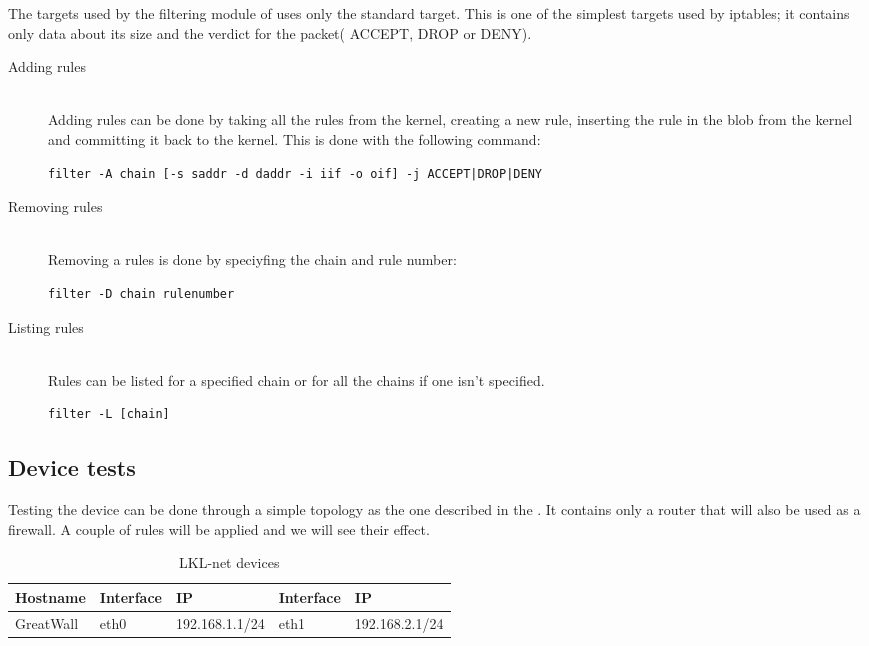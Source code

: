 The targets used by the filtering module of \text{\project} uses only the standard target. This is one of the simplest targets
used by iptables; it contains only data about its size and the verdict for the packet( ACCEPT, DROP or DENY).

\begin{description}
\item[Adding rules] \hfill \\
Adding rules can be done by taking all the rules from the kernel, creating a 
new rule, inserting the rule in the blob from the kernel and committing it back
to the kernel. This is done with the following command:
\lstset{language=zsh,caption=Adding a rule,label=lst:saddrule}
\begin{lstlisting}
filter -A chain [-s saddr -d daddr -i iif -o oif] -j ACCEPT|DROP|DENY
\end{lstlisting}
\item[Removing rules] \hfill \\
Removing a rules is done by speciyfing the chain and rule number:
\lstset{language=zsh,caption=Deleting a rule,label=lst:sdelrule}
\begin{lstlisting}
filter -D chain rulenumber
\end{lstlisting}
\item[Listing rules] \hfill \\
Rules can be listed for a specified chain or for all the chains if one isn't specified.
\lstset{language=zsh,caption=List rules,label=lst:slstrule}
\begin{lstlisting}
filter -L [chain]
\end{lstlisting}
\end{description}

\subsection{Device tests}
\label{sub-sec:firewall-tests}

Testing the device can be done through a simple topology as the one described in the . 
It contains only a router that will also be used as a firewall. A couple of rules will be applied 
and we will see their effect.


\begin{center}
  \begin{table}[htb]
  \begin{center}
  \begin{tabular}{| l | l | l | l | l |}
    \hline
      Hostname & Interface & IP & Interface & IP \\ \hline
      GreatWall & eth0 & 192.168.1.1/24 & eth1 & 192.168.2.1/24 \\ 
    \hline
  \end{tabular}
  \end{center}
  \caption{LKL-net devices}
  \label{table:tdevices}
  \end{table}
\end{center}

